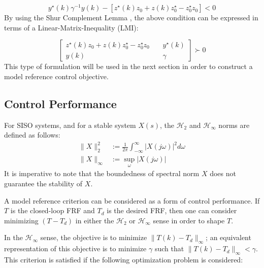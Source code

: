 \documentclass[a4paper, 10pt, conference]{ieeeconf}
\begin{document}
\begin{equation}
y^{\star}(k) \gamma^{-1} y(k) - [z^{\star}(k)z_0 + z(k)z_0^{\star} - z_0^{\star}z_0]< 0 
\end{equation}
By using the Shur Complement Lemma \cite{BEN09}, the above condition can be expressed in terms of a Linear-Matrix-Inequality (LMI):

\begin{equation} \label{eq:LMI_1}
\begin{bmatrix}
z^{\star}(k)z_0 + z(k)z_0^{\star} - z_0^{\star}z_0 & \phantom{kk} y^{\star}(k) \\
y(k) & \phantom{kk} \gamma
\end{bmatrix}
\succ 0
\end{equation}
This type of formulation will be used in the next section in order to construct a model reference control objective. 

\subsection{Control Performance}  \label{sec:controlperformance}
For SISO systems, and for a stable system $X(s)$, the $\mathcal{H}_2$ and $\mathcal{H}_\infty$ norms are defined as follows:
\begin{align*}
\| X\|_2^2 & := \frac{1}{2\pi} \int_{- \infty}^\infty |X(j\omega)|^2 d\omega \\
\| X\|_\infty & :=  \sup_{\omega} |X(j\omega)|
\end{align*}
It is imperative to note that the boundedness of spectral norm $X$ does not guarantee the stability of $X$. 

A model reference criterion can be considered as a form of control performance. If $T$ is the closed-loop FRF and $T_d$ is the desired FRF, then one can consider minimizing $(T-T_d)$ in either the $\mathcal{H}_2$ or $\mathcal{H}_\infty$ sense in order to shape $T$. 

In the $\mathcal{H}_\infty$ sense, the objective is to minimize $ \|T(k) - T_d \|_\infty$; an equivalent representation of this objective is to minimize $\gamma$ such that $ \|T(k) - T_d \|_\infty < \gamma$. This criterion is satisfied if the following optimization problem is considered:
 
\end{document}
